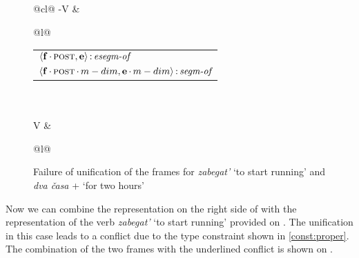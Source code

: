 \begin{figure}
\hfill
\begin{tabular}[t]{@{}cl@{}}
-V &
\begin{tabular}[t]{@{}l@{}}
\\
\end{tabular}
\begin{footnotesize}
\begin{tabular}[t]{@{}l@{}}
$\langle{\textbf{\textrm{f}}\,{\cdot}\,\textsc{post},\textbf{\textrm{e}}}\rangle\,{:}\,\textit{esegm-of}$\\[1ex]
$\tuple{\btag{f}\BC\POST\C\MDIM,\btag{e}\BC\MDIM}\D\type{segm-of}$\\
\end{tabular}
\end{footnotesize}
\\\\
V &
\begin{tabular}[t]{@{}l@{}}
\\
\end{tabular}
\end{tabular}
\hfill
\caption{Failure of unification of the frames for \textit{zabegat'} `to start running' and \textit{dva \v{c}asa}  + `for two hours'}
\label{frame:zabegat:2hours}
\end{figure}

Now we can combine the representation on the right side of  with the representation of the verb \textit{zabegat'} `to start running' provided on . The unification in this case leads to a conflict due to the type constraint shown in \ref{const:proper}. The combination of the two frames with the underlined conflict is shown on . 

